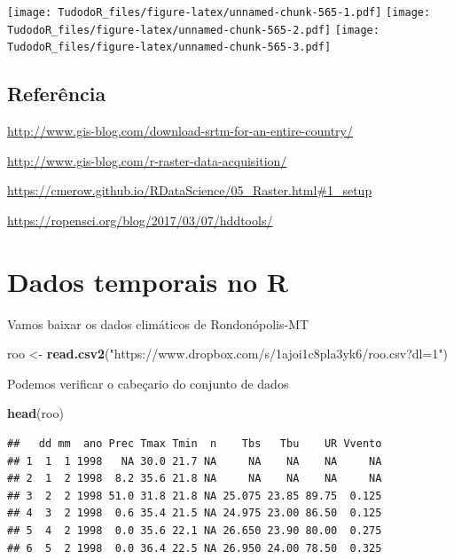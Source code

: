 \documentclass[
]{book}
\newenvironment{Shaded}{\begin{snugshade}}{\end{snugshade}}
\newcommand{\KeywordTok}[1]{\textcolor[rgb]{0.13,0.29,0.53}{\textbf{#1}}}
\newcommand{\NormalTok}[1]{#1}
\newcommand{\StringTok}[1]{\textcolor[rgb]{0.31,0.60,0.02}{#1}}
\begin{document}
\texttt{[image: TudodoR\_files/figure-latex/unnamed-chunk-565-1.pdf]} \texttt{[image: TudodoR\_files/figure-latex/unnamed-chunk-565-2.pdf]} \texttt{[image: TudodoR\_files/figure-latex/unnamed-chunk-565-3.pdf]}

\hypertarget{referuxeancia-7}{%
\subsection{Referência}\label{referuxeancia-7}}

\url{http://www.gis-blog.com/download-srtm-for-an-entire-country/}

\url{http://www.gis-blog.com/r-raster-data-acquisition/}

\url{https://cmerow.github.io/RDataScience/05_Raster.html\#1_setup}

\url{https://ropensci.org/blog/2017/03/07/hddtools/}

\hypertarget{dados-temporais-no-r}{%
\section{Dados temporais no R}\label{dados-temporais-no-r}}

Vamos baixar os dados climáticos de Rondonópolis-MT

\begin{Shaded}
\begin{Highlighting}[]
\NormalTok{roo <-}\StringTok{ }\KeywordTok{read.csv2}\NormalTok{(}\StringTok{"https://www.dropbox.com/s/1ajoi1c8pla3yk6/roo.csv?dl=1"}\NormalTok{)}
\end{Highlighting}
\end{Shaded}

Podemos verificar o cabeçario do conjunto de dados

\begin{Shaded}
\begin{Highlighting}[]
\KeywordTok{head}\NormalTok{(roo)}
\end{Highlighting}
\end{Shaded}

\begin{verbatim}
##   dd mm  ano Prec Tmax Tmin  n    Tbs   Tbu    UR Vvento
## 1  1  1 1998   NA 30.0 21.7 NA     NA    NA    NA     NA
## 2  1  2 1998  8.2 35.6 21.8 NA     NA    NA    NA     NA
## 3  2  2 1998 51.0 31.8 21.8 NA 25.075 23.85 89.75  0.125
## 4  3  2 1998  0.6 35.4 21.5 NA 24.975 23.00 86.50  0.125
## 5  4  2 1998  0.0 35.6 22.1 NA 26.650 23.90 80.00  0.275
## 6  5  2 1998  0.0 36.4 22.5 NA 26.950 24.00 78.50  0.325
\end{verbatim}
\end{document}
